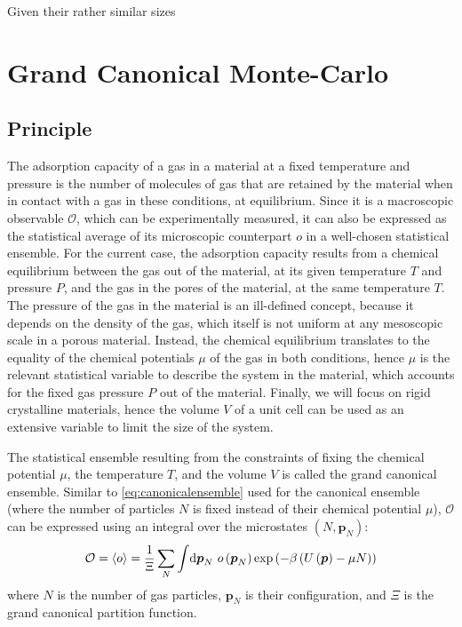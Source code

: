 \documentclass[main.tex]{subfiles}
\begin{document}
Given their rather similar sizes


\section{Grand Canonical Monte-Carlo}
\label{GCMC}

\subsection{Principle}

The adsorption capacity of a gas in a material at a fixed temperature and pressure is the number of molecules of gas that are retained by the material when in contact with a gas in these conditions, at equilibrium. Since it is a macroscopic observable $\mathcal O$, which can be experimentally measured, it can also be expressed as the statistical average of its microscopic counterpart $o$ in a well-chosen statistical ensemble. For the current case, the adsorption capacity results from a chemical equilibrium between the gas out of the material, at its given temperature $T$ and pressure $P$, and the gas in the pores of the material, at the same temperature $T$. The pressure of the gas in the material is an ill-defined concept, because it depends on the density of the gas, which itself is not uniform at any mesoscopic scale in a porous material. Instead, the chemical equilibrium translates to the equality of the chemical potentials $\mu$ of the gas in both conditions, hence $\mu$ is the relevant statistical variable to describe the system in the material, which accounts for the fixed gas pressure $P$ out of the material. Finally, we will focus on rigid crystalline materials, hence the volume $V$ of a unit cell can be used as an extensive variable to limit the size of the system.

The statistical ensemble resulting from the constraints of fixing the chemical potential $\mu$, the temperature $T$, and the volume $V$ is called the grand canonical ensemble. Similar to \cref{eq:canonicalensemble} used for the canonical ensemble (where the number of particles $N$ is fixed instead of their chemical potential $\mu$), $\mathcal O$ can be expressed using an integral over the microstates $(N,\boldsymbol p_N)$:
\[\mathcal O = \left<o\right> = \frac1\Xi\sum_N\int\!\text d{\boldsymbol p_N}\  o\left({\boldsymbol p_N}\right)\exp\left(-\beta \left(U\left({\boldsymbol p}\right) - \mu N\right)\right)\label{eq:grandcanonicalensemble}\]
where $N$ is the number of gas particles, $\boldsymbol p_N$ is their configuration, and $\Xi$ is the grand canonical partition function.
\end{document}
